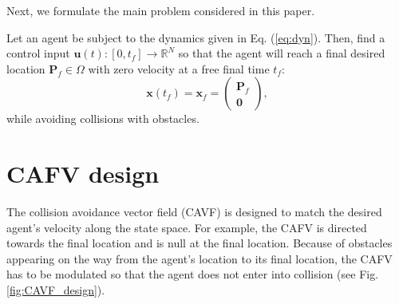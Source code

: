Next, we formulate the main problem considered in this paper.

\begin{problem} \label{prob_init}
Let an agent be subject to the dynamics given in Eq. (\ref{eq:dyn}). Then, find a control input $\bm{u}(t) : [0,t_f] \rightarrow \mathbb{R}^N$ so that the agent will reach a final desired location $\bm{P}_f \in \Omega$ with zero velocity at a free final time $t_f$:
\[
    \bm{x}(t_f) = \bm{x}_f = \begin{pmatrix} \bm{P}_f \\ \bm{0} \end{pmatrix},
\]
while avoiding collisions with obstacles.
\end{problem}

\section{CAFV design} \label{sec:cavf_design}

The collision avoidance vector field (CAVF) is designed to match the desired agent's velocity along the state space. For example, the CAFV is directed towards the final location and is null at the final location. Because of obstacles appearing on the way from the agent's location to its final location, the CAFV has to be modulated so that the agent does not enter into collision (see Fig. \ref{fig:CAVF_design}).

